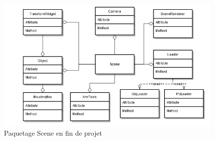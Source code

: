 \begin{figure}[h]
		\centering
                \includegraphics[scale=0.5]{f_scene.png}
		\caption{\label{fig:scene} Paquetage Scene en fin de projet \protect \footnotemark}
\end{figure}
